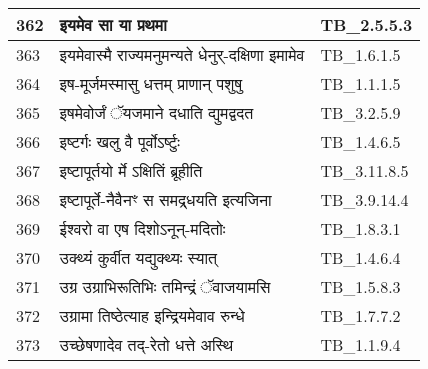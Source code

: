 \documentclass[17pt]{extarticle}
\begin{document}
\begin{longtable}{||p{0.4in}||p{4.9in}||p{0.9in}||}
    \hline
        
    362 & इयमेव सा या प्रथमा & TB\_2.5.5.3       \\
    
    \hline
        
    363 & इयमेवास्मै राज्यमनुमन्यते धेनुर्{-}दक्षिणा इमामेव & TB\_1.6.1.5       \\
    
    \hline
        
    364 & इष{-}मूर्जमस्मासु धत्तम् प्राणान् पशुषु & TB\_1.1.1.5       \\
    
    \hline
        
    365 & इषमेवोर्जं ॅयजमाने दधाति द्युमद्वदत & TB\_3.2.5.9       \\
    
    \hline
        
    366 & इष्टर्गः खलु वै पूर्वोऽर्ष्टुः & TB\_1.4.6.5       \\
    
    \hline
        
    367 & इष्टापूर्तयो र्मे ऽक्षितिं ब्रूहीति & TB\_3.11.8.5       \\
    
    \hline
        
    368 & इष्टापूर्ते{-}नैवैनꣳ स समद्र्धयति इत्यजिना & TB\_3.9.14.4       \\
    
    \hline
        
    369 & ईश्वरो वा एष दिशोऽनून्{-}मदितोः & TB\_1.8.3.1       \\
    
    \hline
        
    370 & उक्थ्यं कुर्वीत यद्युक्थ्यः स्यात् & TB\_1.4.6.4       \\
    
    \hline
        
    371 & उग्र उग्राभिरूतिभिः तमिन्द्रं ॅवाजयामसि & TB\_1.5.8.3       \\
    
    \hline
        
    372 & उग्रामा तिष्ठेत्याह इन्द्रियमेवाव रुन्धे & TB\_1.7.7.2       \\
    
    \hline
        
    373 & उच्छेषणादेव तद्{-}रेतो धत्ते अस्थि & TB\_1.1.9.4       \\
    
    \hline
        

\end{longtable}
\end{document}
